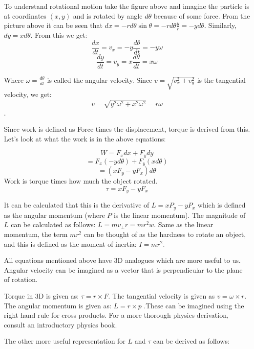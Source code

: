 To understand rotational motion take the figure above and imagine the particle is at coordinates $(x, y)$ and is rotated by angle $d\theta$ because of some force. From the picture above it can be seen that $dx = -rd\theta\sin\theta = -rd\theta\frac{y}{r} = -yd\theta$. Similarly, $dy = xd\theta$. From this we get:
\[
\frac{dx}{dt} = v_x = -y\frac{d\theta}{dt} = -y\omega
\]
\[
\frac{dy}{dt} = v_y =  x\frac{d\theta}{dt} = x\omega
\]

Where $\omega=\frac{d\theta}{dt}$ is called the angular velocity. Since $v = \sqrt{v_x^2 + v_y^2}$ is the tangential velocity, we get:
\[
v = \sqrt{y^2\omega^2 + x^2\omega^2} = r\omega
\].

Since work is defined as Force times the displacement, torque is derived from this. Let's look at what the work is in the above equations:

\[ 
W = F_xdx + F_ydy
\]
\[ 
= F_x(-yd\theta) + F_y(xd\theta)
\]
\[ 
= (xF_y - yF_x)d\theta
\]
Work is torque times how much the object rotated. 
\[
\tau = xF_y - yF_x
\]

It can be calculated that this is the derivative of $L = xP_y - yP_x$ which is defined as the angular momentum (where $P$ is the linear momentum). The magnitude of $L$ can be calculated as follows: $L = mv_{\perp}r = mr^2w$. Same as the linear momentum, the term $mr^2$ can be thought of as the hardness to rotate an object, and this is defined as the moment of inertia: $I = mr^2$.

All equations mentioned above have 3D analogues which are more useful to us. Angular velocity can be imagined as a vector that is perpendicular to the plane of rotation.

Torque in 3D is given as: $\tau = r \times F$. The tangential velocity is given as $v = \omega \times r$. The angular momentum is given as: $L = r \times p$ .These can be imagined using the right hand rule for cross products. For a more thorough physics derivation, consult an introductory physics book.

The other more useful representation for $L$ and $\tau$ can be derived as follows:

